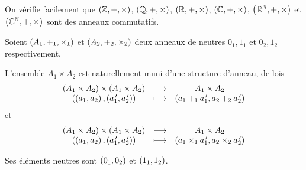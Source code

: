 \begin{ex}
On vérifie facilement que \(\anneau{\Z}\), \(\anneau{\Q}\), \(\anneau{\R}\), \(\anneau{\C}\), \(\anneau{\R^\N}\) et \(\anneau{\C^\N}\) sont des anneaux commutatifs.
\end{ex}

\begin{ex}
Soient \(\anneau{A_1}[+_1][\times_1]\) et \(\anneau{A_2}[+_2][\times_2]\) deux anneaux de neutres \(0_1,1_1\) et \(0_2,1_2\) respectivement.

L'ensemble \(A_1\times A_2\) est naturellement muni d'une structure d'anneau, de lois \[\begin{array}[t]{ccc}\left(A_1\times A_2\right)\times\left(A_1\times A_2\right) & \longrightarrow & A_1\times A_2 \\ \left(\left(a_1,a_2\right),\left(a_1^{\,\prime},a_2^{\,\prime}\right)\right) & \longmapsto & \left(a_1+_1a_1^{\,\prime},a_2+_2a_2^{\,\prime}\right)\end{array}\] et \[\begin{array}[t]{ccc}\left(A_1\times A_2\right)\times\left(A_1\times A_2\right) & \longrightarrow & A_1\times A_2 \\ \left(\left(a_1,a_2\right),\left(a_1^{\,\prime},a_2^{\,\prime}\right)\right) & \longmapsto & \left(a_1\times_1a_1^{\,\prime},a_2\times_2a_2^{\,\prime}\right)\end{array}\]

Ses éléments neutres sont \(\left(0_1,0_2\right)\) et \(\left(1_1,1_2\right)\).
\end{ex}


